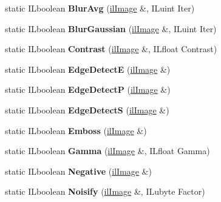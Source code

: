 \begin{DoxyCompactItemize}
static I\+Lboolean {\bfseries Blur\+Avg} (\hyperlink{classilImage}{il\+Image} \&, I\+Luint Iter)
\item 
\mbox{\label{classilFilters_ae1d81ab10cf08d7a0fa4db932a93bb08}} 
static I\+Lboolean {\bfseries Blur\+Gaussian} (\hyperlink{classilImage}{il\+Image} \&, I\+Luint Iter)
\item 
\mbox{\label{classilFilters_a4f49e9ded30829e5e70f7e39588ee308}} 
static I\+Lboolean {\bfseries Contrast} (\hyperlink{classilImage}{il\+Image} \&, I\+Lfloat Contrast)
\item 
\mbox{\label{classilFilters_a8322055521f70b182c1ab7bc8dc907df}} 
static I\+Lboolean {\bfseries Edge\+DetectE} (\hyperlink{classilImage}{il\+Image} \&)
\item 
\mbox{\label{classilFilters_aef519861ad2fac4bf3bde431d1b26e17}} 
static I\+Lboolean {\bfseries Edge\+DetectP} (\hyperlink{classilImage}{il\+Image} \&)
\item 
\mbox{\label{classilFilters_ac8e0f068f4bb99cadc85cc38f1474e09}} 
static I\+Lboolean {\bfseries Edge\+DetectS} (\hyperlink{classilImage}{il\+Image} \&)
\item 
\mbox{\label{classilFilters_a2fd5e100856cd8295cfbabf36c5d9cce}} 
static I\+Lboolean {\bfseries Emboss} (\hyperlink{classilImage}{il\+Image} \&)
\item 
\mbox{\label{classilFilters_a6dd6b152a3cd471042a8bc38d0bc7a7e}} 
static I\+Lboolean {\bfseries Gamma} (\hyperlink{classilImage}{il\+Image} \&, I\+Lfloat Gamma)
\item 
\mbox{\label{classilFilters_a3d20636ac4a2dc7011c40198931a89b5}} 
static I\+Lboolean {\bfseries Negative} (\hyperlink{classilImage}{il\+Image} \&)
\item 
\mbox{\label{classilFilters_aa14d0e50776475624375fc30f226d6fa}} 
static I\+Lboolean {\bfseries Noisify} (\hyperlink{classilImage}{il\+Image} \&, I\+Lubyte Factor)
\item 
\mbox{\label{classilFilters_a29550c3adab5f3e24283bb650f67911c}} 

\end{DoxyCompactItemize}
